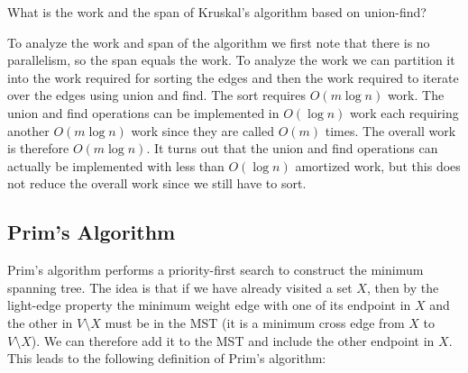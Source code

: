 \begin{comment}
The algorithm is correct since it always takes the lightest weight edge
The intuitive reason for its correctness is that it constructs a
spanning tree by considering the edges from the smallest to the
largest weight.  In other words, it is almost a literal application of
the light-edge rule.  We can argue for correctness more carefully via
proof by contradiction. Assume that the result is wrong.  This means
that some lightest edge $e$ for a cut is not in the MST. Consider the
time at which that $e$ was considered by the algorithm.  Since $e$ is
not chosen, its end points are in the same component and thus there is
a path between them that crosses that path. Consider the edge $e'$
that crosses the cut.  Since the algorithm picks edges in sorted
order, the weight of $e'$ is less than that of $e$. But then $e$ is
not the lightest edge crossing the cut; a contradiction.  We therefore
conclude that $e$ is in the MST and thus the result is correct.
\end{comment}

\begin{question}
What is the work and the span of Kruskal's algorithm based on union-find? 
\end{question}

To analyze the work and span of the algorithm we first note that there
is no parallelism, so the span equals the work.  To analyze the work
we can partition it into the work required for sorting the edges and
then the work required to iterate over the edges using union and find.
The sort requires $O(m \log n)$ work.  The union and find operations
can be implemented in $O(\log n)$ work each requiring another $O(m
\log n)$ work since they are called $O(m)$ times.  The overall work is
therefore $O(m \log n)$.  It turns out that the union and find
operations can actually be implemented with less than $O(\log n)$
amortized work, but this does not reduce the overall work since we
still have to sort.

\subsection{Prim's Algorithm}

Prim's algorithm performs a priority-first search to construct the
minimum spanning tree.  The idea is that if we have already visited a
set $X$, then by the light-edge property the minimum weight edge with
one of its endpoint in $X$ and the other in $V \setminus X$ must be in
the MST (it is a minimum cross edge from $X$ to $V \setminus X$).  We
can therefore add it to the MST and include the other endpoint in $X$.
This leads to the following definition of Prim's algorithm:

